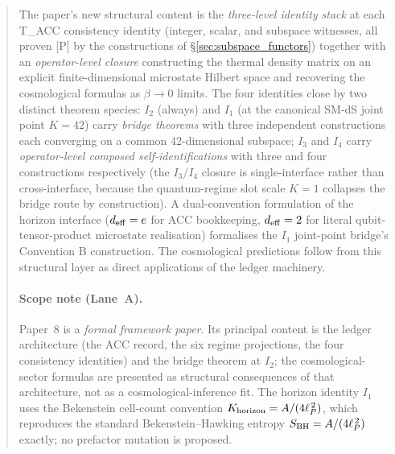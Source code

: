 \documentclass[11pt]{article}
\begin{document}
\begin{abstract}
The paper's new structural content is the \emph{three-level identity stack} at each T\_ACC consistency identity (integer, scalar, and subspace witnesses, all proven [P] by the constructions of \S\ref{sec:subspace_functors}) together with an \emph{operator-level closure} constructing the thermal density matrix on an explicit finite-dimensional microstate Hilbert space and recovering the cosmological formulas as $\beta\!\to\!0$ limits. The four identities close by two distinct theorem species: $I_2$ (always) and $I_1$ (at the canonical SM-dS joint point $K = 42$) carry \emph{bridge theorems} with three independent constructions each converging on a common 42-dimensional subspace; $I_3$ and $I_4$ carry \emph{operator-level composed self-identifications} with three and four constructions respectively (the $I_3/I_4$ closure is single-interface rather than cross-interface, because the quantum-regime slot scale $K = 1$ collapses the bridge route by construction). A dual-convention formulation of the horizon interface ($d_{\rm eff} = e$ for ACC bookkeeping, $d_{\rm eff} = 2$ for literal qubit-tensor-product microstate realisation) formalises the $I_1$ joint-point bridge's Convention B construction.  The cosmological predictions follow from this structural layer as direct applications of the ledger machinery.

\paragraph{Scope note (Lane~A).}  Paper~8 is a \emph{formal framework paper}.  Its principal content is the ledger architecture (the ACC record, the six regime projections, the four consistency identities) and the bridge theorem at $I_2$; the cosmological-sector formulas are presented as structural consequences of that architecture, not as a cosmological-inference fit.  The horizon identity $I_1$ uses the Bekenstein cell-count convention $K_{\rm horizon} = A/(4\ell_P^{\,2})$, which reproduces the standard Bekenstein--Hawking entropy $S_{\rm BH} = A/(4\ell_P^{\,2})$ exactly; no prefactor mutation is proposed.


\end{abstract}
\end{document}
